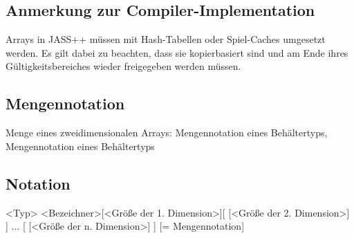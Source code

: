 \subsection{Anmerkung zur Compiler-Implementation}
Arrays in JASS++ müssen mit Hash-Tabellen oder Spiel-Caches umgesetzt werden. Es gilt dabei zu beachten, dass sie kopierbasiert sind
und am Ende ihres Gültigkeitsbereiches wieder freigegeben werden müssen.

\subsection{Mengennotation}
Menge eines zweidimensionalen Arrays:
{ Mengennotation eines Behältertyps, Mengennotation eines Behältertyps }

\subsection{Notation}
<Typ> <Bezeichner>[<Größe der 1. Dimension>][ [<Größe der 2. Dimension>] ] ... [ [<Größe der n. Dimension>] ] [= Mengennotation]